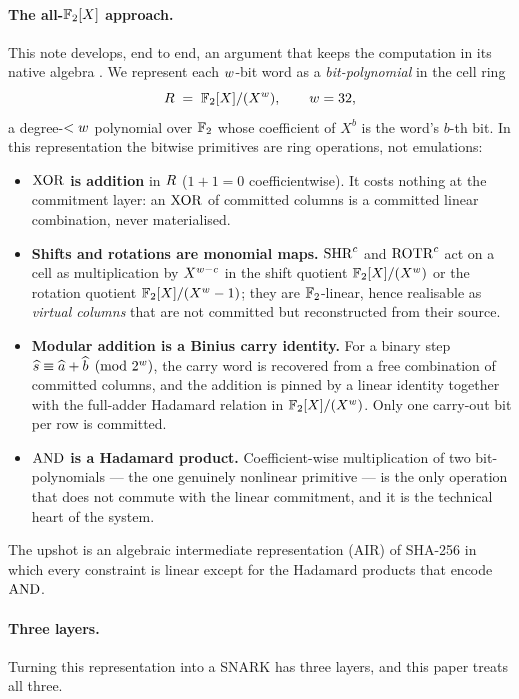 \paragraph{The all-$\mathbb{F}_2[X]$ approach.} This note develops, end to end,
an argument that keeps the computation in its native algebra . We
represent each $w$-bit word as a \emph{bit-polynomial} in the cell
ring
\[
  R \;=\; \mathbb{F}_2[X]/(X^{w}),
  \qquad w = 32,
\]
a degree-$<w$ polynomial over $\mathbb{F}_2$ whose coefficient of $X^b$ is
the word's $b$-th bit. In this representation the bitwise primitives are
ring operations, not emulations:
\begin{itemize}[leftmargin=2em]
  \item \textbf{$\operatorname{XOR}$ is addition} in $R$ ($1+1=0$
    coefficientwise). It costs nothing at the commitment layer: an
    $\operatorname{XOR}$ of committed columns is a committed linear combination, never
    materialised.
  \item \textbf{Shifts and rotations are monomial maps.} $\operatorname{SHR}^c$ and
    $\operatorname{ROTR}^c$ act on a cell as multiplication by $X^{w-c}$ in the
    shift quotient $\mathbb{F}_2[X]/(X^{w})$ or the rotation quotient $\mathbb{F}_2[X]/(X^{w}-1)$; they are
    $\mathbb{F}_2$-linear, hence realisable as \emph{virtual columns} that are
    not committed but reconstructed from their source.
  \item \textbf{Modular addition is a Binius carry identity.} For a
    binary step $\widehat{s} \equiv \widehat{a}+\widehat{b}\pmod{2^{w}}$, the carry
    word is recovered from a free combination of committed columns, and
    the addition is pinned by a linear identity together with the
    full-adder Hadamard relation in $\mathbb{F}_2[X]/(X^{w})$. Only one carry-out bit per
    row is committed.
  \item \textbf{$\operatorname{AND}$ is a Hadamard product.} Coefficient-wise
    multiplication of two bit-polynomials --- the one genuinely nonlinear
    primitive --- is the only operation that does not commute with the
    linear commitment, and it is the technical heart of the system. 
\end{itemize}
The upshot is an algebraic intermediate representation (AIR) of SHA-256
in which every constraint is linear except for the Hadamard products
that encode $\operatorname{AND}$.

\paragraph{Three layers.} Turning this representation into a SNARK has
three layers, and this paper treats all three.

